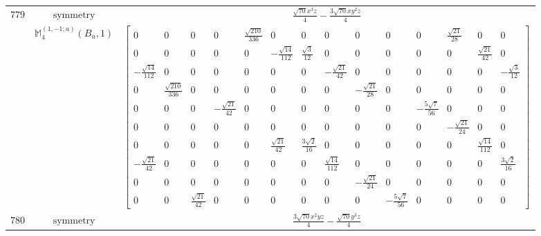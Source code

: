 \documentclass[fleqn,8pt,landscape]{jsarticle}
\begin{document}
\begin{longtable}{ccc}
$ 779 $ & $ \text{symmetry} $ & $ \frac{\sqrt{70} x^{3} z}{4} - \frac{3 \sqrt{70} x y^{2} z}{4} $ \\
$  $ & $ \mathbb{M}_{4}^{(1,-1;a)}(B_{u},1) $ & $ \begin{bmatrix} 0 & 0 & 0 & 0 & \frac{\sqrt{210}}{336} & 0 & 0 & 0 & 0 & 0 & 0 & \frac{\sqrt{21}}{28} & 0 & 0 \\ 0 & 0 & 0 & 0 & 0 & - \frac{\sqrt{14}}{112} & \frac{\sqrt{3}}{12} & 0 & 0 & 0 & 0 & 0 & \frac{\sqrt{21}}{42} & 0 \\ - \frac{\sqrt{14}}{112} & 0 & 0 & 0 & 0 & 0 & 0 & - \frac{\sqrt{21}}{42} & 0 & 0 & 0 & 0 & 0 & - \frac{\sqrt{3}}{12} \\ 0 & \frac{\sqrt{210}}{336} & 0 & 0 & 0 & 0 & 0 & 0 & - \frac{\sqrt{21}}{28} & 0 & 0 & 0 & 0 & 0 \\ 0 & 0 & 0 & - \frac{\sqrt{21}}{42} & 0 & 0 & 0 & 0 & 0 & 0 & - \frac{5 \sqrt{7}}{56} & 0 & 0 & 0 \\ 0 & 0 & 0 & 0 & 0 & 0 & 0 & 0 & 0 & 0 & 0 & - \frac{\sqrt{21}}{24} & 0 & 0 \\ 0 & 0 & 0 & 0 & 0 & \frac{\sqrt{21}}{42} & \frac{3 \sqrt{2}}{16} & 0 & 0 & 0 & 0 & 0 & \frac{\sqrt{14}}{112} & 0 \\ - \frac{\sqrt{21}}{42} & 0 & 0 & 0 & 0 & 0 & 0 & \frac{\sqrt{14}}{112} & 0 & 0 & 0 & 0 & 0 & \frac{3 \sqrt{2}}{16} \\ 0 & 0 & 0 & 0 & 0 & 0 & 0 & 0 & - \frac{\sqrt{21}}{24} & 0 & 0 & 0 & 0 & 0 \\ 0 & 0 & \frac{\sqrt{21}}{42} & 0 & 0 & 0 & 0 & 0 & 0 & - \frac{5 \sqrt{7}}{56} & 0 & 0 & 0 & 0 \end{bmatrix} $ \\ \hline
$ 780 $ & $ \text{symmetry} $ & $ \frac{3 \sqrt{70} x^{2} y z}{4} - \frac{\sqrt{70} y^{3} z}{4} $ \\

\end{longtable}
\end{document}
